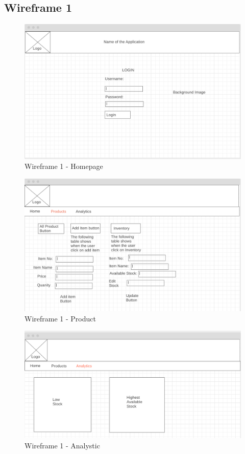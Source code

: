 \subsection{Wireframe 1}
\begin{figure}[h]
\centering
    \includegraphics[scale=0.37]
    {wireframe1/HomePage.png}
    \caption{Wireframe 1 - Homepage}
    \label{fig:Wireframe 1 - Homepage}
\end{figure}

\begin{figure}[H]
\centering
    \includegraphics[scale=0.37]
    {wireframe1/Product.png}
    \caption{Wireframe 1 - Product}
    \label{fig:Wireframe 1 - product}
\end{figure}

\begin{figure}[H]
\centering
    \includegraphics[scale=0.37]
    {wireframe1/Analystic.png}
    \caption{Wireframe 1 - Analystic}
    \label{fig:Wireframe 1 - Analystic}
\end{figure}

